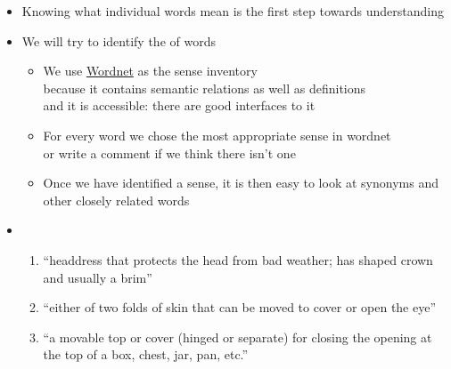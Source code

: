 \documentclass[a4paper,landscape,headrule,footrule,xetex]{foils}
\begin{document}
\begin{itemize}
\item Knowing what individual words mean is the first step towards understanding
\item We will try to identify the  of words
  \begin{itemize}
  \item We use \href{https://wordnet.princeton.edu/}{Wordnet} \citep{_Fellbaum:1998} as the sense inventory
    \\ because it contains semantic relations as well as definitions
    \\ and it is accessible: there are good interfaces to it
  \item For every word we chose the most appropriate sense in wordnet
    \\ or write a comment if we think there isn't one
  \item Once we have identified a sense, it is then easy to look at
    synonyms and other closely related words
  \end{itemize}
  \newpage
\item {}\task{}
  \begin{enumerate}\small
  \item {} ``headdress that protects the head
    from bad weather; has shaped crown and usually a brim''
  \item {} ``either of two folds of skin that
    can be moved to cover or open the eye''
  \item {} ``a movable top or cover (hinged or separate) for closing the opening at the top of a box, chest, jar, pan, etc.''

  \end{enumerate}


\end{itemize}
\end{document}
